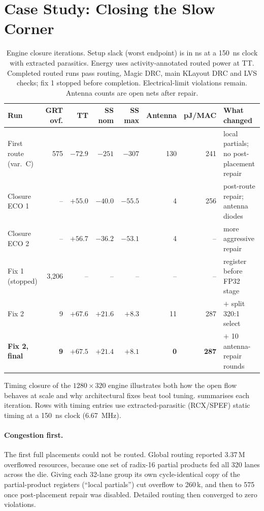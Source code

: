 \section{Case Study: Closing the Slow Corner}
\label{sec:closure}

\begin{table}[t]
\centering\small
\caption{Engine closure iterations. Setup slack (worst endpoint) is in ns at a \SI{150}{ns} clock with extracted parasitics. Energy uses activity-annotated routed power at TT. Completed routed runs pass routing, Magic DRC, main KLayout DRC and LVS checks; fix 1 stopped before completion. Electrical-limit violations remain. Antenna counts are open nets after repair.}
\label{tab:closure}
\setlength{\tabcolsep}{4.5pt}
\begin{tabular}{@{}lrrrrrrl@{}}
\toprule
Run & GRT ovf. & TT & SS nom & SS max & Antenna & pJ/MAC & What changed\\
\midrule
First route (var.\ C) & 575 & $-72.9$ & $-251$ & $-307$ & 130 & 241 & local partials; no post-placement repair\\
Closure ECO 1 & -- & $+55.0$ & $-40.0$ & $-55.5$ & 4 & 256 & post-route repair; antenna diodes\\
Closure ECO 2 & -- & $+56.7$ & $-36.2$ & $-53.1$ & 4 & -- & more aggressive repair\\
Fix 1 (stopped) & 3,206 & -- & -- & -- & -- & -- & register before FP32 stage\\
Fix 2 & 9 & $+67.6$ & $+21.6$ & $+8.3$ & 11 & 287 & $+$ split 320:1 select\\
\textbf{Fix 2, final} & \textbf{9} & $\mathbf{+67.5}$ & $\mathbf{+21.4}$ & $\mathbf{+8.1}$ & \textbf{0} & \textbf{287} & $+$ 10 antenna-repair rounds\\
\bottomrule
\end{tabular}
\end{table}

Timing closure of the $1280\times320$ engine illustrates both how the open flow behaves at scale and why architectural fixes beat tool tuning.  summarises each iteration. Rows with timing entries use extracted-parasitic (RCX/SPEF) static timing at a \SI{150}{ns} clock (\SI{6.67}{MHz}).

\paragraph{Congestion first.}
The first full placements could not be routed. Global routing reported 3.37\,M overflowed resources, because one set of radix-16 partial products fed all 320 lanes across the die. Giving each 32-lane group its own cycle-identical copy of the partial-product registers (``local partials'') cut overflow to 260\,k, and then to 575 once post-placement repair was disabled. Detailed routing then converged to zero violations.

